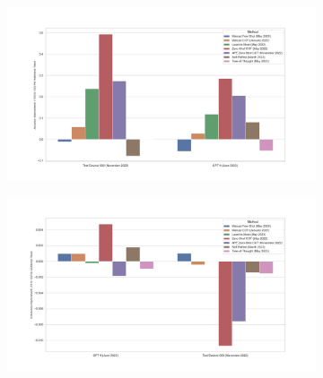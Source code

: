 \documentclass{beamer}
\begin{document}
\begin{frame}
\begin{figure}[h]
            \begin{subfigure}[h]{0.4925\textwidth}
                \centering
                \includegraphics[width=1.1\hsize]{../Output/gsm8k_change_in_accuracy_quality_per_change_in_conversation_length_sorted_by_technique_age.png} 
            \end{subfigure}
            \hfill
            \begin{subfigure}[h]{0.4925\textwidth}
                \centering
                \includegraphics[width=1.1\hsize]{../Output/cw_change_in_accuracy_quality_per_change_in_conversation_length_sorted_by_technique_age.png}
            \end{subfigure}

        \end{figure}

    \end{frame}
\end{document}
